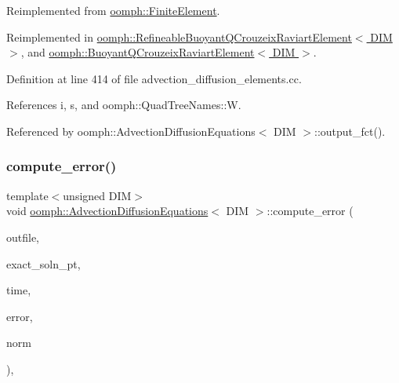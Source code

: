 Reimplemented from \hyperlink{classoomph_1_1FiniteElement_a73c79a1f1e5b1d334757812a6bbd58ff}{oomph\+::\+Finite\+Element}.



Reimplemented in \hyperlink{classoomph_1_1RefineableBuoyantQCrouzeixRaviartElement_a078039343f5f9bb467a1183f725d1873}{oomph\+::\+Refineable\+Buoyant\+Q\+Crouzeix\+Raviart\+Element$<$ D\+I\+M $>$}, and \hyperlink{classoomph_1_1BuoyantQCrouzeixRaviartElement_a2aa63b1b2ec1130835ee87cbf52cc086}{oomph\+::\+Buoyant\+Q\+Crouzeix\+Raviart\+Element$<$ D\+I\+M $>$}.



Definition at line 414 of file advection\+\_\+diffusion\+\_\+elements.\+cc.



References i, s, and oomph\+::\+Quad\+Tree\+Names\+::W.



Referenced by oomph\+::\+Advection\+Diffusion\+Equations$<$ D\+I\+M $>$\+::output\+\_\+fct().

\mbox{\label{classoomph_1_1AdvectionDiffusionEquations_a87c8c4e8ff5ea6e6dcb243ec83bb4fd2}} 
\subsubsection{\texorpdfstring{compute\+\_\+error()}{compute\_error()}\hspace{0.1cm}{\footnotesize\ttfamily [2/2]}}
{\footnotesize\ttfamily template$<$unsigned D\+IM$>$ \\
void \hyperlink{classoomph_1_1AdvectionDiffusionEquations}{oomph\+::\+Advection\+Diffusion\+Equations}$<$ D\+IM $>$\+::compute\+\_\+error (\begin{DoxyParamCaption}\item[{std\+::ostream \&}]{outfile,  }\item[{\hyperlink{classoomph_1_1FiniteElement_ad4ecf2b61b158a4b4d351a60d23c633e}{Finite\+Element\+::\+Unsteady\+Exact\+Solution\+Fct\+Pt}}]{exact\+\_\+soln\+\_\+pt,  }\item[{const double \&}]{time,  }\item[{double \&}]{error,  }\item[{double \&}]{norm }\end{DoxyParamCaption})\hspace{0.3cm}{\ttfamily [inline]}, {\ttfamily [virtual]}}



